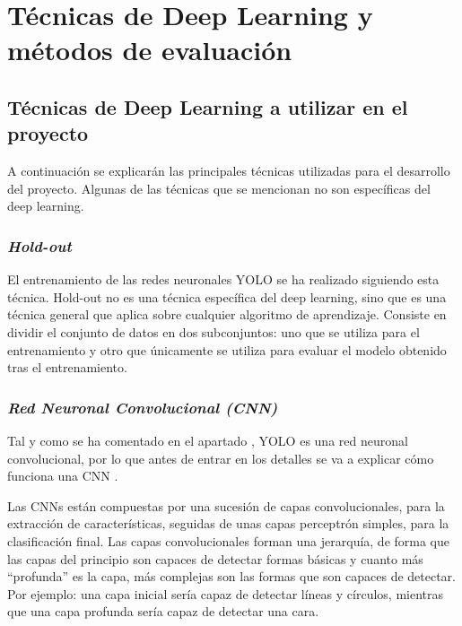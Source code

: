 \section{Técnicas de Deep Learning y métodos de evaluación}
\label{sec:tecnicas_de_deep_learning_y_metodos_de_evaluacion}

\subsection{Técnicas de Deep Learning a utilizar en el proyecto}

A continuación se explicarán las principales técnicas utilizadas para el desarrollo del proyecto. Algunas de las técnicas que se mencionan no son específicas del deep learning.

\subsubsection*{\textit{Hold-out}}

El entrenamiento de las redes neuronales YOLO se ha realizado siguiendo esta técnica. Hold-out no es una técnica específica del deep learning, sino que es una técnica general que aplica sobre cualquier algoritmo de aprendizaje. Consiste en dividir el conjunto de datos en dos subconjuntos: uno que se utiliza para el entrenamiento y otro que únicamente se utiliza para evaluar el modelo obtenido tras el entrenamiento.

\subsubsection*{\textit{Red Neuronal Convolucional (CNN)}}

Tal y como se ha comentado en el apartado \textit{}, YOLO es una red neuronal convolucional, por lo que antes de entrar en los detalles se va a explicar cómo funciona una CNN \cite{s5_cnn1} \cite{s5_cnn2}.

Las CNNs están compuestas por una sucesión de capas convolucionales, para la extracción de características, seguidas de unas capas perceptrón simples, para la clasificación final. Las capas convolucionales forman una jerarquía, de forma que las capas del principio son capaces de detectar formas básicas y cuanto más ``profunda'' es la capa, más complejas son las formas que son capaces de detectar. Por ejemplo: una capa inicial sería capaz de detectar líneas y círculos, mientras que una capa profunda sería capaz de detectar una cara.

